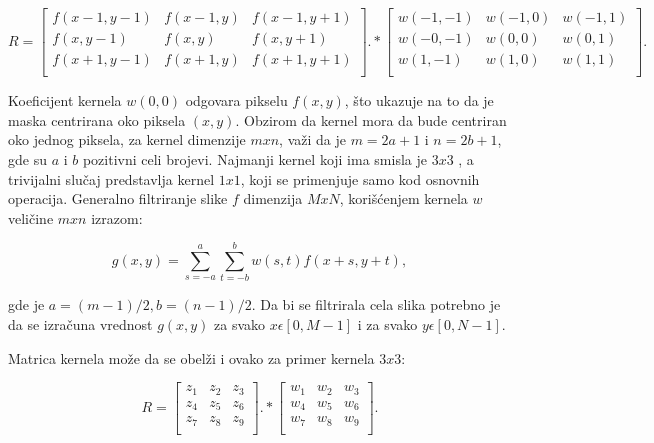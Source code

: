 \documentclass[a4paper,12pt,titlepage]{article}
\begin{document}
\begin{equation}\label{eq:conv2}
R
=
\begin{bmatrix}
     f(x - 1, y - 1) & f(x - 1, y) & f(x - 1, y + 1) \\
     f(x, y - 1) & f(x , y) & f(x, y + 1) \\
     f(x + 1, y - 1) & f(x + 1, y) & f(x + 1, y + 1) \\
\end{bmatrix}
.*
\begin{bmatrix}
     w(- 1, - 1) & w(- 1, 0) & w(- 1, 1) \\
     w(-0, - 1) & w(0, 0) & w(0, 1) \\
     w(1, - 1) & w(1, 0) & w(1, 1) \\
\end{bmatrix}
.\end{equation}

Koeficijent kernela $w(0, 0)$ odgovara pikselu $f(x, y)$, što ukazuje na to da je maska centrirana oko piksela $(x, y)$. Obzirom da kernel mora da bude centriran oko jednog piksela, za kernel dimenzije $m x n$, važi da je $m = 2a + 1$ i $n = 2b + 1$, gde su $a$ i $b$ pozitivni celi brojevi. Najmanji kernel koji ima smisla je $3 x 3$ , a trivijalni slučaj predstavlja kernel $1 x 1$, koji se primenjuje samo kod osnovnih operacija. Generalno filtriranje slike $f$ dimenzija $M x N$, korišćenjem kernela $w$ veličine $m x n$ izrazom:

\begin{equation}\label{eq:conv3}
g(x, y)  = \sum_{s = -a}^{a} \sum_{t = -b}^{b} w(s, t) f(x + s, y + t),
\end{equation}

gde je $a = (m - 1) / 2, b = (n - 1) / 2$. Da bi se filtrirala cela slika potrebno je da se izračuna vrednost $g(x, y)$ za svako $x \epsilon [0, M - 1]$ i za svako $y \epsilon [0, N - 1]$. 

Matrica kernela može da se obelži i ovako za primer kernela $3 x 3$:

\begin{equation}\label{eq:conv4}
R
=
\begin{bmatrix}
     z_{1} & z_{2} & z_{3} \\
     z_{4} & z_{5} & z_{6} \\
     z_{7} & z_{8} & z_{9} \\
\end{bmatrix}
.*
\begin{bmatrix}
     w_{1} & w_{2} & w_{3} \\
     w_{4} & w_{5} & w_{6} \\
     w_{7} & w_{8} & w_{9} \\
\end{bmatrix}
.\end{equation}
\end{document}
